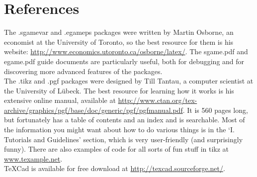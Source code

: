 \documentclass[10.5pt]{article}
\begin{document}



\section{References}

The .sgamevar and .egameps packages were written by Martin Osborne, an economist at the University of Toronto, so the best resource for them is his website: \href{http://www.economics.utoronto.ca/osborne/latex/}{http://www.economics.utoronto.ca/osborne/latex/}.  The sgame.pdf and egame.pdf guide documents are particularly useful, both for debugging and for discovering more advanced features of the packages. \\

The .tikz and .pgf packages were designed by Till Tantau, a computer scientist at the University of L\"{u}beck.  The best resource for learning how it works is his extensive online manual, available at \href{http://www.ctan.org/tex-archive/graphics/pgf/base/doc/generic/pgf/pgfmanual.pdf}{http://www.ctan.org/tex-archive/graphics/pgf/base/doc/generic/pgf/pgfmanual.pdf}.  It is 560 pages long, but fortunately has a table of contents and an index and is searchable.  Most of the information you might want about how to do various things is in the `I. Tutorials and Guidelines' section, which is very user-friendly (and surprisingly funny).  There are also examples of code for all sorts of fun stuff in tikz at \href{www.texample.net}{www.texample.net}. \\

TeXCad is available for free download at \href{http://texcad.sourceforge.net/}{http://texcad.sourceforge.net/}.\\
\end{document}
